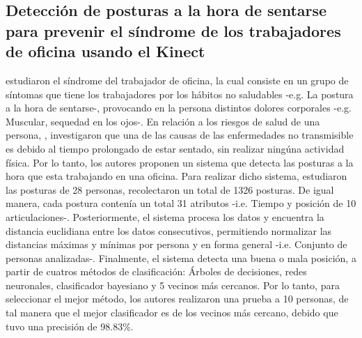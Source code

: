 \subsection{Detecci\'on de posturas a la hora de sentarse para prevenir el s\'indrome de los trabajadores de oficina usando el Kinect} \label{tr:3}
 estudiaron el s\'indrome del trabajador de oficina, la cual consiste en un grupo de s\'intomas que tiene los trabajadores por los h\'abitos no saludables -e.g. La postura a la hora de sentarse-, provocando en la persona distintos dolores corporales -e.g. Muscular, sequedad en los ojos-.
\medbreak
En relaci\'on a los riesgos de salud de una persona, , investigaron que una de las causas de las enfermedades no transmisible es debido al tiempo prolongado de estar sentado, sin realizar ning\'una actividad f\'isica. Por lo tanto, los autores  proponen un sistema que detecta las posturas a la hora que esta trabajando en una oficina.
\medbreak
Para realizar dicho sistema,  estudiaron las posturas de 28 personas,  recolectaron un total de 1326 posturas. De igual manera, cada postura conten\'ia un total 31 atributos -i.e. Tiempo y posici\'on de 10 articulaciones-. Posteriormente, el sistema procesa los datos y encuentra la distancia euclidiana entre los datos consecutivos, permitiendo normalizar las distancias m\'aximas y m\'inimas por persona y en forma general -i.e. Conjunto de personas analizadas-.
\medbreak
Finalmente, el sistema detecta una buena o mala posici\'on, a partir de cuatros m\'etodos de clasificaci\'on: \'Arboles de decisiones, redes neuronales, clasificador bayesiano y 5 vecinos m\'as cercanos. Por lo tanto, para seleccionar el mejor m\'etodo, los autores realizaron una prueba a 10 personas, de tal manera que el mejor  clasificador es de los vecinos m\'as cercano, debido que tuvo una precisi\'on de  98.83\%. 
